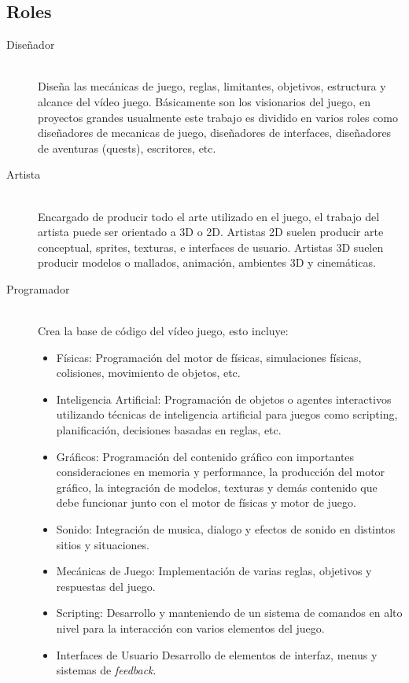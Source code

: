 \subsection{Roles}
\small
\begin{description}
\item[Diseñador] \hfill \\
Diseña las mecánicas de juego, reglas, limitantes, objetivos, estructura y alcance del vídeo juego. Básicamente son los visionarios del juego, en proyectos grandes usualmente este trabajo es dividido en varios roles como diseñadores de mecanicas de juego, diseñadores de interfaces, diseñadores de aventuras (quests), escritores, etc.
\item[Artista] \hfill \\
Encargado de producir todo el arte utilizado en el juego, el trabajo del artista puede ser orientado a 3D o 2D. Artistas 2D suelen producir arte conceptual, sprites, texturas, e interfaces de usuario. Artistas 3D suelen producir modelos o mallados, animación, ambientes 3D y cinemáticas.
\normalsize
\item[Programador] \hfill \\
Crea la base de código del vídeo juego, esto incluye:
\begin{itemize}
\item Físicas: Programación del motor de físicas, simulaciones físicas, colisiones, movimiento de objetos, etc.
\item Inteligencia Artificial: Programación de objetos o agentes interactivos utilizando técnicas de inteligencia artificial para juegos como scripting, planificación, decisiones basadas en reglas, etc.
\item Gráficos: Programación del contenido gráfico con importantes consideraciones en memoria y performance, la producción del motor gráfico, la integración de modelos, texturas y demás contenido que debe funcionar junto con el motor de físicas y motor de juego.
\item Sonido: Integración de musica, dialogo y efectos de sonido en distintos sitios y situaciones. 
\item Mecánicas de Juego: Implementación de varias reglas, objetivos y respuestas del juego. 
\item Scripting: Desarrollo y manteniendo de un sistema de comandos en alto nivel para la interacción con varios elementos del juego.
\item Interfaces de Usuario
Desarrollo de elementos de interfaz, menus y sistemas de \emph{feedback}.

\end{itemize}
\end{description}
